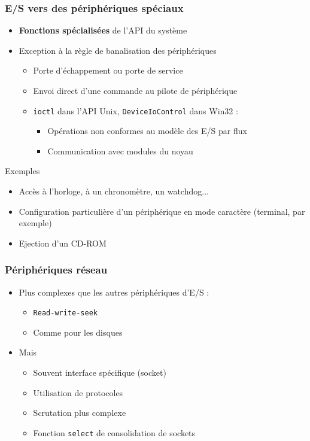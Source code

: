 \begin{frame}
\frametitle{E/S vers des périphériques spéciaux}
\begin{itemize}
\item \textbf{Fonctions spécialisées} de l'API du système
\item Exception à la règle de banalisation des périphériques
\begin{itemize}
\item Porte d'échappement ou porte de service
\item Envoi direct d'une commande au pilote de périphérique
\item \texttt{ioctl} dans l'API Unix, \texttt{DeviceIoControl} dans Win32 :
\begin{itemize}
\item Opérations non conformes au modèle des E/S par flux
\item Communication avec modules du noyau
\end{itemize}
\end{itemize}
\end{itemize}

\begin{exampleblock}{Exemples}
\begin{itemize}
\item Accès à l'horloge, à un chronomètre, un watchdog...
\item Configuration particulière d'un périphérique en mode caractère (terminal, par exemple)
\item Ejection d'un CD-ROM
\end{itemize}
\end{exampleblock}
\end{frame}

\begin{frame}
\frametitle{Périphériques réseau}
\begin{itemize}
\item Plus complexes que les autres périphériques d'E/S :
\begin{itemize}
\item \texttt{Read-write-seek}
\item Comme pour les disques
\end{itemize}
\item Mais
\begin{itemize}
\item Souvent interface spécifique (socket)
\item Utilisation de protocoles
\item Scrutation plus complexe
\item Fonction \texttt{select} de consolidation de sockets
\end{itemize}
\end{itemize}
\end{frame}

